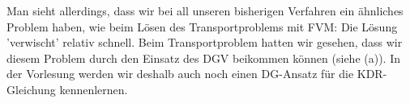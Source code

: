 \begin{figure}[H]
\end{figure}

Man sieht allerdings, dass wir bei all unseren bisherigen Verfahren ein ähnliches Problem haben, wie beim Lösen des Transportproblems mit FVM: Die Lösung 'verwischt' relativ schnell. Beim Transportproblem hatten wir gesehen, dass wir diesem Problem durch den Einsatz des DGV beikommen können (siehe (a)).
In der Vorlesung werden wir deshalb auch noch einen DG-Ansatz für die KDR-Gleichung kennenlernen.
